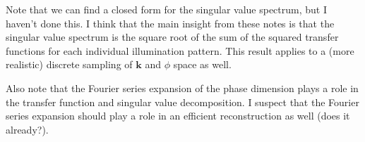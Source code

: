\documentclass[11pt]{article}
\providecommand{\mb}[1]{\mathbf{#1}}
\providecommand{\bs}[1]{\boldsymbol{#1}}
\begin{document}
Note that we can find a closed form for the singular value spectrum, but I
haven't done this. I think that the main insight from these notes is that the
singular value spectrum is the square root of the sum of the squared transfer
functions for each individual illumination pattern. This result applies to a
(more realistic) discrete sampling of $\mb{k}$ and $\phi$ space as well. 

Also note that the Fourier series expansion of the phase dimension plays a role
in the transfer function and singular value decomposition. I suspect that the
Fourier series expansion should play a role in an efficient reconstruction as
well (does it already?).

\end{document}
